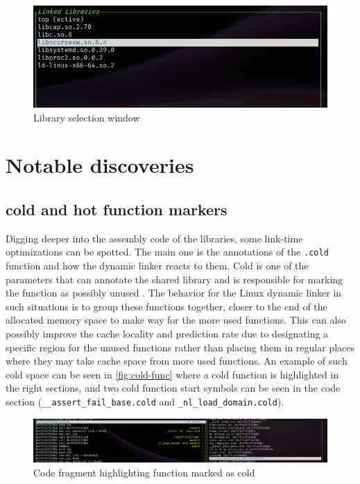 \begin{figure}
    \centering
    \includegraphics[width=0.7\linewidth]{tui-lib-select.png}
    \caption{Library selection window}
    \label{fig:lib-select}
\end{figure}

\section{Notable discoveries}

\subsection{cold and hot function markers}

Digging deeper into the assembly code of the libraries, some link-time optimizations can be spotted.
The main one is the annotations of the \verb|.cold| function and how the dynamic linker reacts to them.
Cold is one of the parameters that can annotate the shared library and is responsible for marking the function as possibly unused \cite{noauthor_common_nodate}.
The behavior for the Linux dynamic linker in such situations is to group these functions together, closer to the end of the allocated memory space to make way for the more used functions.
This can also possibly improve the cache locality and prediction rate due to designating a specific region for the unused functions rather than placing them in regular places where they may take cache space from more used functions.
An example of such cold space can be seen in \autoref{fig:cold-func} where a cold function is highlighted in the right sections, and two cold function start symbols can be seen in the code section (\verb|__assert_fail_base.cold| and \verb|_nl_load_domain.cold|).

\begin{figure}[h]
    \centering
    \includegraphics[width=1\linewidth]{cold-starts.png}
    \caption{Code fragment highlighting function marked as cold}
    \label{fig:cold-func}
\end{figure}

